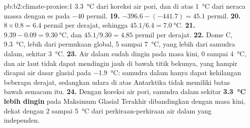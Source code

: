 \begin{solution}{pb:b2:climate-proxies:1}
\qty{3.3}{\celsius} dari koreksi air pori, dan di atas \qty{1}{\celsius} dari neraca
massa dengan es pada $-40$ permil.
\textbf{19.} $-396.6 - (-441.7) = 45.1$ permil.
\textbf{20.} $8 \times 0.8 = 6.4$ permil per derajat, sehingga $45.1/6.4 = \qty{7.0}{\celsius}$.
\textbf{21.} $9.39 - 0.09 = \qty{9.30}{\celsius}$, dan $45.1/9.30 = 4.85$ permil per derajat.
\textbf{22.} Dome C, \qty{9.3}{\celsius}, lebih dari permukaan global, 5 sampai \qty{7}{\celsius}, yang lebih
dari samudra dalam, sekitar \qty{3}{\celsius}.
\textbf{23.} Air dalam sudah dingin pada masa kini, 0 sampai \qty{4}{\celsius}, dan air laut tidak dapat
mendingin jauh di bawah titik bekunya, yang hampir dicapai air dasar glasial pada
\qty{-1.9}{\celsius}: samudra dalam hanya dapat kehilangan beberapa derajat, sedangkan udara di atas Antarktika
tidak memiliki batas bawah semacam itu.
\textbf{24.} Dengan koreksi air pori, samudra dalam sekitar \textbf{\qty{3.3}{\celsius}
lebih dingin} pada Maksimum Glasial Terakhir dibandingkan dengan masa kini, dekat dengan 2 sampai \qty{5}{\celsius} dari
perkiraan-perkiraan air dalam yang independen.
\end{solution}
